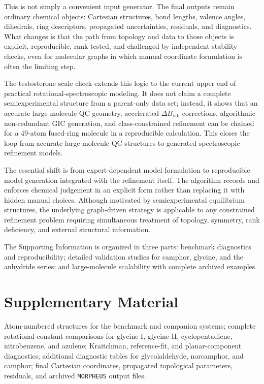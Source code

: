 \documentclass[aip,jcp,reprint,longbibliography,floatfix]{revtex4-2}
\begin{document}
This is not simply a convenient input generator. The final outputs remain
ordinary chemical objects: Cartesian structures, bond lengths, valence angles,
dihedrals, ring descriptors, propagated uncertainties, residuals, and
diagnostics. What changes is that the path from topology and data to those
objects is explicit, reproducible, rank-tested, and challenged by independent
stability checks, even for molecular graphs in which manual coordinate
formulation is often the limiting step.

The testosterone scale check extends this logic to the current upper end of
practical rotational-spectroscopic modeling. It does not claim a complete
semiexperimental structure from a parent-only data set; instead, it shows that
an accurate large-molecule QC geometry, accelerated $\Delta B_\mathrm{vib}$
corrections, algorithmic non-redundant GIC generation, and class-constrained
refinement can be chained for a 49-atom fused-ring molecule in a
reproducible calculation. This closes the loop from accurate
large-molecule QC structures to generated spectroscopic
refinement models.

The essential shift is from expert-dependent model formulation to reproducible
model generation integrated with the refinement itself. The
algorithm records and enforces chemical judgement in an explicit form rather
than replacing it with hidden manual choices. Although motivated by
semiexperimental equilibrium structures, the underlying graph-driven strategy
is applicable to any constrained refinement problem requiring simultaneous
treatment of topology, symmetry, rank deficiency, and external structural
information.

The Supporting Information is organized in three parts: benchmark diagnostics
and reproducibility; detailed validation studies for camphor, glycine, and the
anhydride series; and large-molecule scalability with complete archived
examples.

\section*{Supplementary Material}

Atom-numbered structures for the benchmark and companion systems; complete
rotational-constant comparisons for glycine I, glycine II, cyclopentadiene,
nitrobenzene, and azulene; Kraitchman, reference-fit, and planar-component
diagnostics; additional diagnostic tables for glycolaldehyde, norcamphor, and
camphor; final Cartesian coordinates, propagated topological parameters,
residuals, and archived \texttt{MORPHEUS} output files.
\end{document}
